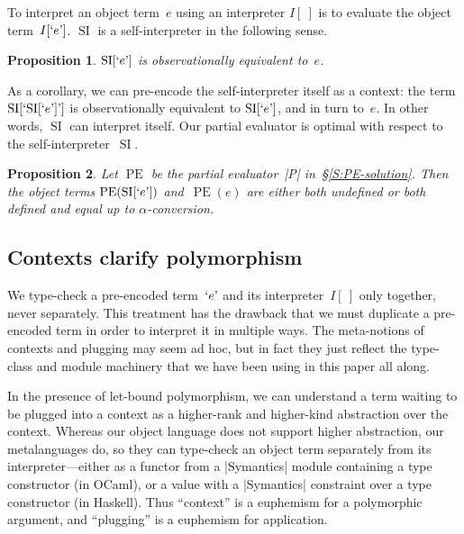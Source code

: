 \documentclass[preprint]{sigplanconf}
\newtheorem{prop}{Proposition}
\newcommand{\encode}[1]{\mathinner{\mathopen{\text{`}}#1\mathclose{\text{'}}}}
\DeclareMathOperator{\pe}{PE}
\DeclareMathOperator{\si}{SI}
\begin{document}
To interpret an object term~$e$ using an interpreter $I[~]$ is to
evaluate the object term~$I[\encode{e}]$.  $\si$ is
a self\hyp interpreter in the following sense.
\begin{prop}
    $\si[\encode{e}]$ is observationally equivalent to~$e$.
\end{prop}
As a corollary, we can pre-encode the self\hyp interpreter itself as
a context: the term $\si[\encode{\si[\encode{e}]}]$ is observationally
equivalent to $\si[\encode{e}]$, and in turn to~$e$.  In other words,
$\si$ can interpret itself.  Our partial evaluator is optimal with respect to
the self\hyp interpreter~$\si$.
\begin{prop}
    Let $\pe$ be the partial evaluator~|P| in~\S\ref{S:PE-solution}.
    Then the object terms $\pe(\si[\encode{e}])$ and~$\pe(e)$ are
    either both undefined or both defined and
    equal up to $\alpha$\hyp conversion.
\end{prop}

\subsection{Contexts clarify polymorphism}

We type-check a pre-encoded term~$\encode{e}$ and its interpreter~$I[~]$
only together, never separately.  This treatment has the drawback that
we must duplicate a pre-encoded term in order to interpret it in
multiple ways.  The meta-notions of contexts and plugging may seem ad
hoc, but in fact they just reflect the type-class and module
machinery that we have been using in this paper all along.

In the presence of let-bound polymorphism, we can understand a term
waiting to be plugged into a context as a higher-rank and higher-kind
abstraction over the context.  Whereas our object language does not support
higher abstraction, our metalanguages do, so they can type-check an object term
separately from its interpreter---either as a functor from a |Symantics| module
containing a type constructor
(in OCaml), or a value with a |Symantics| constraint over a type
constructor (in Haskell).  Thus
``context'' is a euphemism for a polymorphic argument, and ``plugging''
is a euphemism for application.
\end{document}
